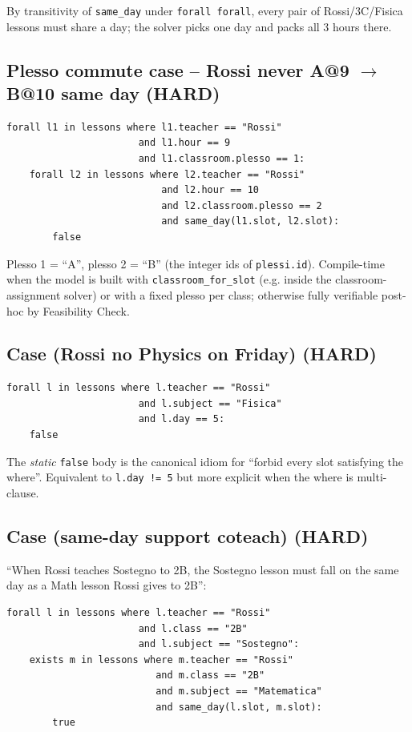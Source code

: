 By transitivity of \texttt{same\_day} under
\texttt{forall forall}, every pair of Rossi/3C/Fisica lessons
must share a day; the solver picks one day and packs all 3
hours there.

\subsection{Plesso commute case -- Rossi never A@9 $\to$
B@10 same day (HARD)}

\begin{lstlisting}
forall l1 in lessons where l1.teacher == "Rossi"
                       and l1.hour == 9
                       and l1.classroom.plesso == 1:
    forall l2 in lessons where l2.teacher == "Rossi"
                           and l2.hour == 10
                           and l2.classroom.plesso == 2
                           and same_day(l1.slot, l2.slot):
        false
\end{lstlisting}

Plesso 1 = ``A'', plesso 2 = ``B'' (the integer ids of
\texttt{plessi.id}). Compile-time when the model is built with
\texttt{classroom\_for\_slot} (e.g. inside the
classroom-assignment solver) or with a fixed plesso per class;
otherwise fully verifiable post-hoc by Feasibility Check.

\subsection{Case (Rossi no Physics on Friday) (HARD)}

\begin{lstlisting}
forall l in lessons where l.teacher == "Rossi"
                       and l.subject == "Fisica"
                       and l.day == 5:
    false
\end{lstlisting}

The \emph{static} \texttt{false} body is the canonical idiom
for ``forbid every slot satisfying the where''. Equivalent to
\texttt{l.day != 5} but more explicit when the where is
multi-clause.

\subsection{Case (same-day support coteach) (HARD)}

``When Rossi teaches Sostegno to 2B, the Sostegno lesson must
fall on the same day as a Math lesson Rossi gives to 2B'':
\begin{lstlisting}
forall l in lessons where l.teacher == "Rossi"
                       and l.class == "2B"
                       and l.subject == "Sostegno":
    exists m in lessons where m.teacher == "Rossi"
                          and m.class == "2B"
                          and m.subject == "Matematica"
                          and same_day(l.slot, m.slot):
        true
\end{lstlisting}

